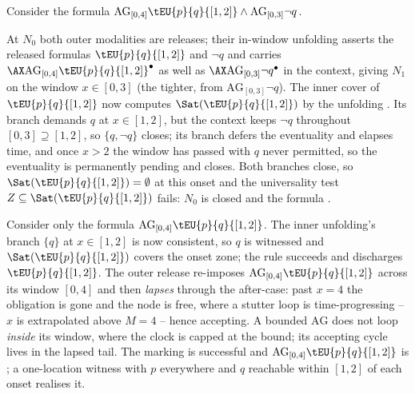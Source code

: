 \begin{example}%
Consider the formula $\mathrm{AG}_{[0,4]}\tEU{p}{q}{[1,2]} \land \mathrm{AG}_{[0,3]}\neg q$.

At $N_0$ both outer modalities are releases; their in-window unfolding asserts the released formulas
$\tEU{p}{q}{[1,2]}$ and $\neg q$ and carries $\AX\mathrm{AG}_{[0,4]}\tEU{p}{q}{[1,2]}^\bullet$ as well as $\AX\mathrm{AG}_{[0,3]}\neg q^\bullet$ in the context, giving $N_1$ on the
window $x\in[0,3]$ (the tighter, from $\mathrm{AG}_{[0,3]}\neg q$). The inner cover of $\tEU{p}{q}{[1,2]}$ now computes $\Sat(\tEU{p}{q}{[1,2]})$ by
the unfolding . Its  branch demands $q$ at $x\in[1,2]$, but the context keeps
$\neg q$ throughout $[0,3]\supseteq[1,2]$, so $\{q,\neg q\}$ closes; its  branch defers the
eventuality and elapses time, and once $x>2$ the window has passed with $q$ never permitted, so the
eventuality is permanently pending and closes. Both branches close, so $\Sat(\tEU{p}{q}{[1,2]})=\emptyset$ at this
onset and the universality test $Z\subseteq\Sat(\tEU{p}{q}{[1,2]})$ fails: $N_0$ is closed and the formula \UNSAT. 

\end{example}

\begin{example}%
Consider only the formula $\mathrm{AG}_{[0,4]}\tEU{p}{q}{[1,2]}$. The inner unfolding's  branch $\{q\}$ at $x\in[1,2]$ is now consistent, so $q$ is witnessed and $\Sat(\tEU{p}{q}{[1,2]})$ covers the onset zone; the rule  succeeds
and discharges $\tEU{p}{q}{[1,2]}$. The outer release re-imposes $\mathrm{AG}_{[0,4]}\tEU{p}{q}{[1,2]}$
across its window $[0,4]$ and then \emph{lapses} through the after-case: past $x=4$ the obligation is gone and
the node is free, where a stutter loop is time-progressing -- $x$ is extrapolated above $M=4$ -- hence
accepting. A bounded $\mathrm{AG}$ does not loop \emph{inside} its window, where the clock is capped at the
bound; its accepting cycle lives in the lapsed tail. The marking is successful and $\mathrm{AG}_{[0,4]}\tEU{p}{q}{[1,2]}$ is
\SAT; a one-location witness with $p$ everywhere and $q$ reachable within $[1,2]$ of each
onset realises it.
\end{example}
